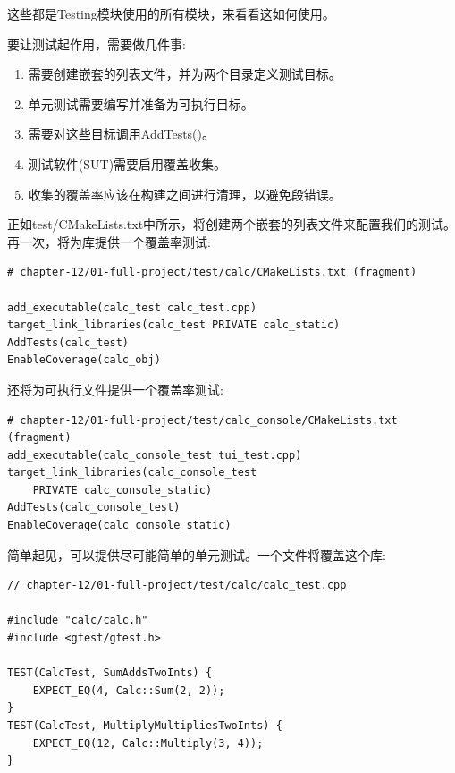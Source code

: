 这些都是Testing模块使用的所有模块，来看看这如何使用。


要让测试起作用，需要做几件事:

\begin{enumerate}
\item 
需要创建嵌套的列表文件，并为两个目录定义测试目标。

\item 
单元测试需要编写并准备为可执行目标。

\item 
需要对这些目标调用AddTests()。

\item 
测试软件(SUT)需要启用覆盖收集。

\item 
收集的覆盖率应该在构建之间进行清理，以避免段错误。
\end{enumerate}

正如test/CMakeLists.txt中所示，将创建两个嵌套的列表文件来配置我们的测试。再一次，将为库提供一个覆盖率测试:

\begin{lstlisting}[style=styleCMake]
# chapter-12/01-full-project/test/calc/CMakeLists.txt (fragment)

add_executable(calc_test calc_test.cpp)
target_link_libraries(calc_test PRIVATE calc_static)
AddTests(calc_test)
EnableCoverage(calc_obj)
\end{lstlisting}

还将为可执行文件提供一个覆盖率测试:

\begin{lstlisting}[style=styleCMake]
# chapter-12/01-full-project/test/calc_console/CMakeLists.txt (fragment)
add_executable(calc_console_test tui_test.cpp)
target_link_libraries(calc_console_test
	PRIVATE calc_console_static)
AddTests(calc_console_test)
EnableCoverage(calc_console_static)
\end{lstlisting}

简单起见，可以提供尽可能简单的单元测试。一个文件将覆盖这个库:

\begin{lstlisting}[style=styleCXX]
// chapter-12/01-full-project/test/calc/calc_test.cpp

#include "calc/calc.h"
#include <gtest/gtest.h>

TEST(CalcTest, SumAddsTwoInts) {
	EXPECT_EQ(4, Calc::Sum(2, 2));
}
TEST(CalcTest, MultiplyMultipliesTwoInts) {
	EXPECT_EQ(12, Calc::Multiply(3, 4));
}
\end{lstlisting}

